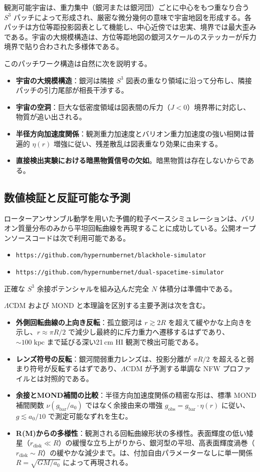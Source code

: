 \documentclass[dvipdfmx,a4paper]{article}
\begin{document}
観測可能宇宙は、重力集中（銀河または銀河団）ごとに中心をもつ重なり合う $S^3$ パッチによって形成され、厳密な微分幾何の意味で宇宙地図を形成する。各パッチは方位等距投影図表として機能し、中心近傍では忠実、境界では最大歪みである。宇宙の大規模構造は、方位等距地図の銀河スケールのステッカーが斥力境界で貼り合わされた多様体である。

このパッチワーク構造は自然に次を説明する。
\begin{itemize}
  \item \textbf{宇宙の大規模構造}：銀河は隣接 $S^3$ 図表の重なり領域に沿って分布し、隣接パッチの引力尾部が相長干渉する。
  \item \textbf{宇宙の空洞}：巨大な低密度領域は図表間の斥力（$J < 0$）境界帯に対応し、物質が追い出される。
  \item \textbf{半径方向加速度関係}：観測重力加速度とバリオン重力加速度の強い相関は普遍的 $\eta(r)$ 増強に従い、残差散乱は図表重なり効果に由来する。
  \item \textbf{直接検出実験における暗黒物質信号の欠如}。暗黒物質は存在しないからである。
\end{itemize}

\subsection{数値検証と反証可能な予測}

ローターアンサンブル動学を用いた予備的粒子ベースシミュレーションは、バリオン質量分布のみから平坦回転曲線を再現することに成功している。公開オープンソースコードは次で利用可能である。
\begin{itemize}
  \item \texttt{https://github.com/hypernumbernet/blackhole-simulator}
  \item \texttt{https://github.com/hypernumbernet/dual-spacetime-simulator}
\end{itemize}
正確な $S^3$ 余接ポテンシャルを組み込んだ完全 $N$ 体積分は準備中である。

$\Lambda$CDM および MOND と本理論を区別する主要予測は次を含む。
\begin{itemize}
  \item \textbf{外側回転曲線の上向き反転}：孤立銀河は $r \gtrsim 2R$ を超えて緩やかな上向きを示し、$r \approx \pi R/2$ で減少し最終的に斥力重力へ遷移するはずであり、$\sim 100\;\mathrm{kpc}$ まで延びる深い21\,cm HI 観測で検出可能である。
  \item \textbf{レンズ符号の反転}：銀河間弱重力レンズは、投影分離が $\pi R/2$ を超えると弱まり符号が反転するはずであり、$\Lambda$CDM が予測する単調な NFW プロファイルとは対照的である。
  \item \textbf{余接とMOND補間の比較}：半径方向加速度関係の精密な形は、標準 MOND 補間関数 $\nu(g_{\text{bar}}/a_0)$ ではなく余接由来の増強 $g_{\text{obs}} = g_{\text{bar}} \cdot \eta(r)$ に従い、$g \lesssim a_0/10$ で測定可能なずれを生む。
  \item \textbf{R(M)からの多様性}：観測される回転曲線形状の多様性。表面輝度の低い矮星（$r_{\text{disk}} \ll R$）の緩慢な立ち上がりから、銀河型の平坦、高表面輝度渦巻（$r_{\text{disk}} \sim R$）の緩やかな減少まで。は、付加自由パラメーターなしに単一関係 $R = \sqrt{GM/a_0}$ によって再現される。
\end{itemize}
\end{document}
